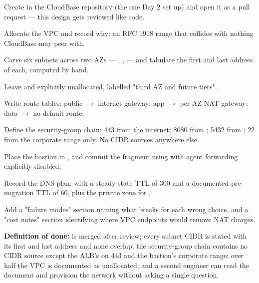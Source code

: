 \begin{buildalong}
\begin{wbitem}
  \item Create  in the CloudBase repository (the one Day 2 set up) and open it as a pull request --- this design gets reviewed like code.
  \item Allocate the VPC  and record why: an RFC 1918 range that collides with nothing CloudBase may peer with.
  \item Carve six  subnets across two AZs --- , ,  --- and tabulate the first and last address of each, computed by hand.
  \item Leave  and  explicitly unallocated, labelled "third AZ and future tiers".
  \item Write route tables: public $\rightarrow$ internet gateway; app $\rightarrow$ per-AZ NAT gateway; data $\rightarrow$ no default route.
  \item Define the security-group chain:  443 from the internet;  8080 from ;  5432 from ;  22 from the corporate range only. No CIDR sources anywhere else.
  \item Place the bastion in , and commit the  fragment using  with agent forwarding explicitly disabled.
  \item Record the DNS plan:  with a steady-state TTL of 300 and a documented pre-migration TTL of 60, plus the private zone for .
  \item Add a "failure modes" section naming what breaks for each wrong choice, and a "cost notes" section identifying where VPC endpoints would remove NAT charges.
\end{wbitem}
\smallskip\textbf{Definition of done:}  is merged after review; every subnet CIDR is stated with its first and last address and none overlap; the security-group chain contains no CIDR source except the ALB's  on 443 and the bastion's corporate range; over half the VPC is documented as unallocated; and a second engineer can read the document and provision the network without asking a single question.
\end{buildalong}


